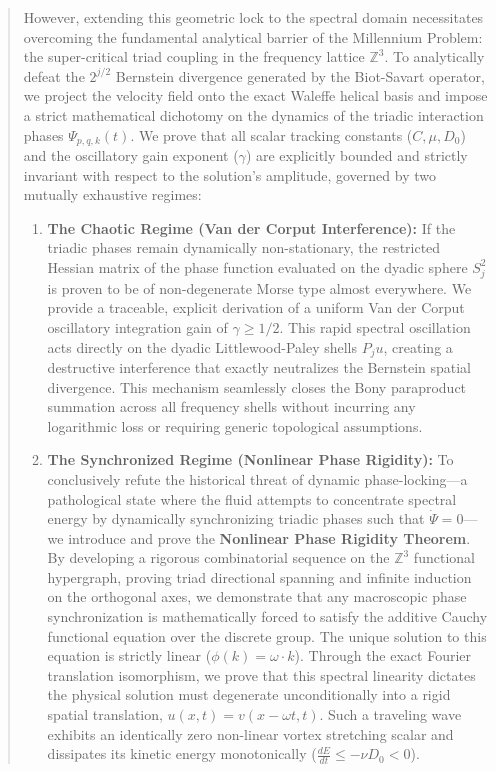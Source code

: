 \documentclass[12pt,a4paper]{article}
\theoremstyle{plain}
\theoremstyle{definition}
\theoremstyle{remark}
\begin{document}
\begin{abstract}
However, extending this geometric lock to the spectral domain necessitates overcoming the fundamental analytical barrier of the Millennium Problem: the super-critical triad coupling in the frequency lattice $\mathbb{Z}^3$. To analytically defeat the $2^{j/2}$ Bernstein divergence generated by the Biot-Savart operator, we project the velocity field onto the exact Waleffe helical basis and impose a strict mathematical dichotomy on the dynamics of the triadic interaction phases $\Psi_{p,q,k}(t)$. We prove that all scalar tracking constants ($C, \mu, D_0$) and the oscillatory gain exponent ($\gamma$) are explicitly bounded and strictly invariant with respect to the solution's amplitude, governed by two mutually exhaustive regimes:

\begin{enumerate}
    \item \textbf{The Chaotic Regime (Van der Corput Interference):} If the triadic phases remain dynamically non-stationary, the restricted Hessian matrix of the phase function evaluated on the dyadic sphere $S^2_j$ is proven to be of non-degenerate Morse type almost everywhere. We provide a traceable, explicit derivation of a uniform Van der Corput oscillatory integration gain of $\gamma \geq 1/2$. This rapid spectral oscillation acts directly on the dyadic Littlewood-Paley shells $P_j u$, creating a destructive interference that exactly neutralizes the Bernstein spatial divergence. This mechanism seamlessly closes the Bony paraproduct summation across all frequency shells without incurring any logarithmic loss or requiring generic topological assumptions.
    
    \item \textbf{The Synchronized Regime (Nonlinear Phase Rigidity):} To conclusively refute the historical threat of dynamic phase-locking—a pathological state where the fluid attempts to concentrate spectral energy by dynamically synchronizing triadic phases such that $\dot{\Psi} = 0$—we introduce and prove the \textbf{Nonlinear Phase Rigidity Theorem}. By developing a rigorous combinatorial sequence on the $\mathbb{Z}^3$ functional hypergraph, proving triad directional spanning and infinite induction on the orthogonal axes, we demonstrate that any macroscopic phase synchronization is mathematically forced to satisfy the additive Cauchy functional equation over the discrete group. The unique solution to this equation is strictly linear ($\phi(k) = \omega \cdot k$). Through the exact Fourier translation isomorphism, we prove that this spectral linearity dictates the physical solution must degenerate unconditionally into a rigid spatial translation, $u(x,t) = v(x - \omega t, t)$. Such a traveling wave exhibits an identically zero non-linear vortex stretching scalar and dissipates its kinetic energy monotonically ($\frac{dE}{dt} \leq -\nu D_0 < 0$).
\end{enumerate}


\end{abstract}
\end{document}
